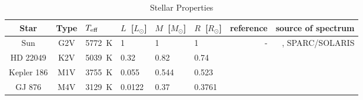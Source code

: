 \documentclass[11pt,numberedappendix,twocolappendix,]{emulateapj}
\begin{document}
\begin{table}[btp]
\caption{Stellar Properties}
\begin{center}
\begin{tabular}{ccllllrr} \hline \hline
%
Star & Type & $T_{\rm eff}$ & $L$~[$L_{\odot}$] & $M$~[$M_{\odot}$] & $R$~[$R_{\odot}$] & reference & source of spectrum \\ \hline
%
Sun & G2V & 5772~K & 1 & 1 & 1 & - & \citet{Lean2005}, SPARC/SOLARIS \footnotemark[1] \\ 
%
HD 22049 & K2V & 5039~K & 0.32 & 0.82 & 0.74 & \citet{Baines2012} & \citet{Segura2003} \\
%
Kepler 186 & M1V & 3755~K & 0.055 & 0.544 & 0.523 & \citet{Torres2015} & \citet{Allard2012} \\
%
GJ 876 & M4V & 3129~K & 0.0122 & 0.37 & 0.3761 & \citet{vonBraun2014} & \citet{Domagal-Goldman2014} \\ \hline
\end{tabular}
\end{center}
\label{tbl:stellar_properties}
\end{table}%
\end{document}
